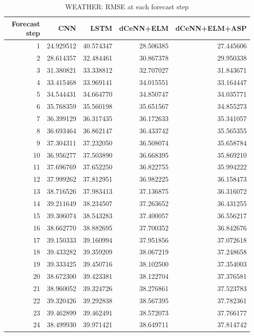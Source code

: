 \begin{table}
\caption{WEATHER: RMSE at each forecast step}
\begin{tabular}{rrrrr}
\toprule
Forecast step & CNN & LSTM & dCeNN+ELM & dCeNN+ELM+ASP \\
\midrule
1 & 24.929512 & 40.574347 & 28.506385 & 27.445606 \\
2 & 28.614357 & 32.484461 & 30.867378 & 29.950338 \\
3 & 31.380821 & 33.338812 & 32.707027 & 31.843671 \\
4 & 33.415468 & 33.969141 & 34.015551 & 33.164447 \\
5 & 34.544431 & 34.664770 & 34.850747 & 34.035771 \\
6 & 35.768359 & 35.560198 & 35.651567 & 34.855273 \\
7 & 36.399129 & 36.317435 & 36.172633 & 35.341057 \\
8 & 36.693464 & 36.862147 & 36.433742 & 35.565355 \\
9 & 37.304311 & 37.232050 & 36.508074 & 35.658784 \\
10 & 36.956277 & 37.503890 & 36.668395 & 35.869210 \\
11 & 37.696769 & 37.652250 & 36.822755 & 35.994222 \\
12 & 37.999262 & 37.812951 & 36.982225 & 36.158473 \\
13 & 38.716526 & 37.983413 & 37.136875 & 36.316072 \\
14 & 39.211649 & 38.234507 & 37.263652 & 36.431255 \\
15 & 39.306074 & 38.543283 & 37.400057 & 36.556217 \\
16 & 38.662770 & 38.882695 & 37.700352 & 36.842676 \\
17 & 39.150333 & 39.160994 & 37.951856 & 37.072618 \\
18 & 39.433282 & 39.359209 & 38.067219 & 37.248658 \\
19 & 39.333425 & 39.450716 & 38.102500 & 37.354003 \\
20 & 38.672300 & 39.423381 & 38.122704 & 37.376581 \\
21 & 38.960052 & 39.324726 & 38.276861 & 37.523783 \\
22 & 39.320426 & 39.292838 & 38.567395 & 37.782361 \\
23 & 39.462899 & 39.462491 & 38.572073 & 37.766177 \\
24 & 38.499930 & 39.971421 & 38.649711 & 37.814742 \\
\bottomrule
\end{tabular}
\end{table}

